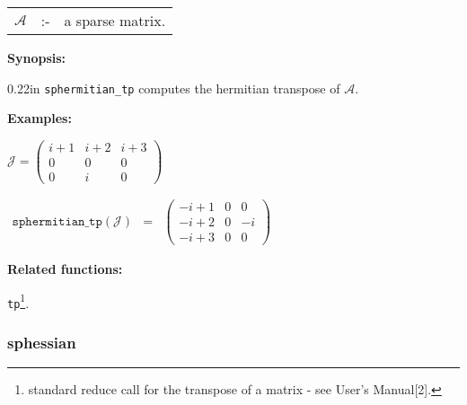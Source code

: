 \hspace*{0.1in} 
\begin{tabular}{l l l}
$\mathcal{A}$ &:-& a sparse matrix. 
\end{tabular}

\textbf{Synopsis:} 

\begin{addtolength}{\leftskip}{0.22in}
                \texttt{sphermitian\_tp} computes the hermitian transpose of 
                $\mathcal{A}$. 

\end{addtolength}

\textbf{Examples:}

\begin{flushleft}  
\hspace*{0.175in}
\begin{math}  
\mathcal{J} = \left( \begin{array}{ccc} i+1 & i+2 & i+3 \\ 0 & 0 & 0 \\ 0 &
i & 0 
\end{array} \right)
\end{math}  
\end{flushleft}

\vspace*{0.1in}

\begin{flushleft}  
\hspace*{0.1in}
\begin{math}        
\begin{array}{ccc}
\texttt{sphermitian\_tp}(\mathcal{J}) & = & 
\left( \begin{array}{ccc} -i+1 & 0 & 0 \\ -i+2 & 0 & -i \\-i+3 & 0 & 0
\end{array} \right)
\end{array}
\end{math}  
\end{flushleft}                   

\textbf{Related functions:}

\hspace*{0.175in} \texttt{tp}\footnote{standard reduce call for the 
transpose of a matrix - see {\REDUCE} User's Manual[2].}.


\subsubsection{sphessian}

